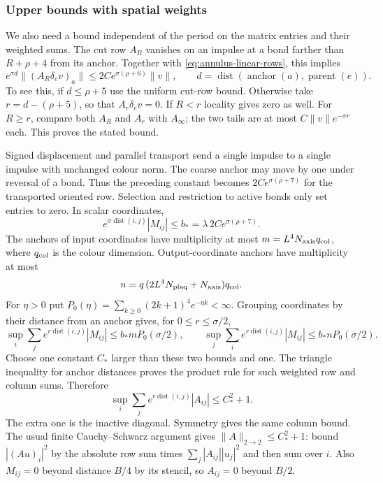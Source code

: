 \subsubsection{Upper bounds with spatial weights}
We also need a bound independent of the period on the matrix
entries and their weighted sums. The cut row $A_R$ vanishes on
an impulse at a bond farther than $R+\rho+4$ from its anchor.
Together with \eqref{eq:annulus-linear-rows}, this implies
\[
 e^{\sigma d}\|(A_R\delta_ev)_a\|
 \le2C e^{\sigma(\rho+6)}\|v\|,
 \qquad d=\operatorname{dist}(\operatorname{anchor}(a),
                                      \operatorname{parent}(e)).
\]
To see this, if $d\le\rho+5$ use the uniform cut-row bound.
Otherwise take $r=d-(\rho+5)$, so that $A_r\delta_ev=0$.
If $R<r$ locality gives zero as well. For $R\ge r$, compare
both $A_R$ and $A_r$ with $A_\infty$; the two tails are at most
$C\|v\|e^{-\sigma r}$ each. This proves the stated bound.

Signed displacement and parallel transport send a single impulse
to a single impulse with unchanged colour norm. The coarse anchor
may move by one under reversal of a bond. Thus the preceding
constant becomes $2Ce^{\sigma(\rho+7)}$ for the transported oriented
row. Selection and restriction to active bonds only set entries
to zero. In scalar coordinates,
\[
 e^{\sigma\operatorname{dist}(i,j)}|M_{ij}|
 \le b_*=\lambda\,2Ce^{\sigma(\rho+7)}.
\]
The anchors of input coordinates have multiplicity at most
$m=L^4N_{\rm axis}q_{\rm col}$, where $q_{\rm col}$ is the
colour dimension. Output-coordinate anchors have multiplicity
at most
\[
 n=q\,(2L^4N_{\rm plaq}+N_{\rm axis})q_{\rm col}.
\]
For $\eta>0$ put
$P_0(\eta)=\sum_{k\ge0}(2k+1)^4e^{-\eta k}<\infty$.
Grouping coordinates by their distance from an anchor gives,
for $0\le r\le\sigma/2$,
\[
 \sup_i\sum_j e^{r\operatorname{dist}(i,j)}|M_{ij}|
 \le b_*mP_0(\sigma/2),\qquad
 \sup_j\sum_i e^{r\operatorname{dist}(i,j)}|M_{ij}|
 \le b_*nP_0(\sigma/2).
\]
Choose one constant $C_*$ larger than these two bounds and one.
The triangle inequality for anchor distances proves the product
rule for such weighted row and column sums. Therefore
\begin{equation}\label{eq:sector-gram-upper}
 \sup_i\sum_j e^{r\operatorname{dist}(i,j)}|A_{ij}|
 \le C_*^2+1.
\end{equation}
The extra one is the inactive diagonal. Symmetry gives the same
column bound. The usual finite Cauchy--Schwarz argument gives
$\|A\|_{2\to2}\le C_*^2+1$: bound
$|(Au)_i|^2$ by the absolute row sum times
$\sum_j|A_{ij}||u_j|^2$ and then sum over $i$.
Also $M_{ij}=0$ beyond distance $B/4$ by its stencil, so
$A_{ij}=0$ beyond $B/2$.

